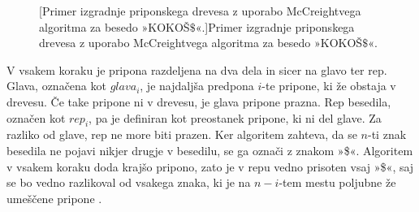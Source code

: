 \begin{figure}[htp]
    \begin{subfigure}[t]{0.3\linewidth}
        
        \centering
        \label{fig:McCreigov1}
    \end{subfigure}
    \hspace{0.5cm}
    \begin{subfigure}[t]{0.3\linewidth}
        
        \centering
        \label{fig:McCreigov2}
    \end{subfigure}
    \hspace{0.5cm}
    \begin{subfigure}[t]{0.3\linewidth}
        
        \centering
        \label{fig:McCreigov3}
    \end{subfigure}
    \par\bigskip 
    \begin{subfigure}[t]{0.3\linewidth}
        
        \centering
        \label{fig:McCreigov4}
    \end{subfigure}
    \hspace{0.5cm}
    \begin{subfigure}[t]{0.3\linewidth}
        
        \centering
        \label{fig:McCreigov5}
    \end{subfigure}
    \hspace{0.5cm}
    \begin{subfigure}[t]{0.3\textwidth}
        
        \centering
        \label{fig:McCreigov6}
    \end{subfigure}
        [Primer izgradnje priponskega drevesa z uporabo McCreightvega algoritma za besedo »KOKOŠ$\$$«.]{Primer izgradnje priponskega drevesa z uporabo McCreightvega algoritma za besedo »KOKOŠ$\$$«.} 
        \label{fig:McCreight}
\end{figure}

V vsakem koraku je pripona razdeljena na dva dela in sicer na glavo ter rep. Glava, označena kot $glava_i$, je najdaljša predpona $i$-te pripone, ki že obstaja v drevesu. Če take pripone ni v drevesu, je glava pripone prazna. Rep besedila, označen kot $rep_i$, pa je definiran kot preostanek pripone, ki ni del glave. Za razliko od glave, rep ne more biti prazen. Ker algoritem zahteva, da se $n$-ti znak besedila ne pojavi nikjer drugje v besedilu, se ga označi z znakom »\$«. Algoritem v vsakem koraku doda krajšo pripono, zato je v repu vedno prisoten vsaj »\$«, saj se bo vedno razlikoval od vsakega znaka, ki je na $n-i$-tem mestu poljubne že umeščene pripone \cite{McCreight1976}.

